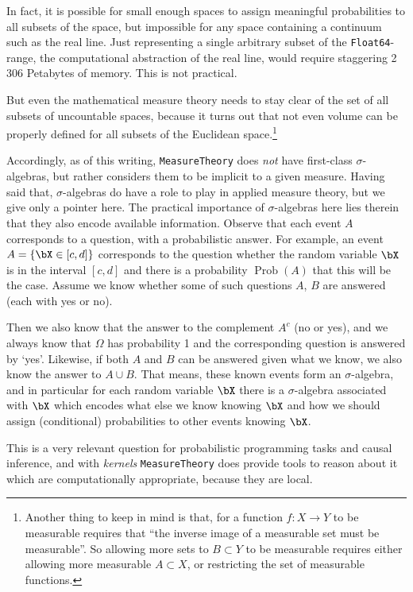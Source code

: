 \documentclass{juliacon}
\begin{document}
In fact, it is possible for small enough spaces to assign meaningful probabilities to all subsets of the space, but impossible for any space containing a continuum such as the real line. Just representing a single arbitrary subset of the \verb|Float64|-range, the computational abstraction of the real line, would require staggering 2\,306 Petabytes of memory. This is not practical.

But even the mathematical measure theory needs to stay clear of the set of all subsets of uncountable spaces, because it turns out that not even volume can be properly defined for all subsets of the Euclidean space.\footnote{Another thing to keep in mind is that, for a function $f\colon X \to Y$ to be measurable requires that ``the inverse image of a measurable set must be measurable''. So allowing more sets to $B\subset Y$ to be measurable requires either allowing more measurable $A\subset X$, or restricting the set of measurable functions.}


Accordingly, as of this writing, \verb|MeasureTheory| does \emph{not} have first-class $\sigma$-algebras, but rather considers them to be implicit to a given measure. 
Having said that, $\sigma$-algebras do have a role to play in applied measure theory, but we give only a pointer here. 
The practical importance of $\sigma$-algebras here lies therein that they also encode available information. Observe that each event $A$ corresponds to a question, with a probabilistic answer. 
 For example, an event $A = \{\bX \in  [c, d]\}$ corresponds to the question whether the random variable $\bX$ is in the interval $[c, d]$ and there is a probability $\operatorname{Prob}(A)$ that this will be the case. 
 Assume we know whether some of such questions $A$, $B$ are answered (each with yes or no).
 
 Then we also know that the answer to the complement $A^c$ (no or yes), and we always know that $\Omega$ has probability 1 and the corresponding question is answered by `yes'. Likewise, if both $A$ and $B$ can be answered given what we know, we also know the answer to $A \cup B$. That means, these known events form an $\sigma$-algebra, and in particular for each random variable $\bX$ there is a $\sigma$-algebra associated with $\bX$ which encodes what else we know knowing $\bX$ and how we should assign (conditional) probabilities to other events knowing $\bX$.
 
 This is a very relevant question for probabilistic programming tasks and causal inference, and with \emph{kernels} \verb|MeasureTheory| does provide tools to reason about it which are computationally appropriate, because they are local.
 
\end{document}
